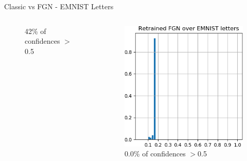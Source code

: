 \documentclass{beamer}
\begin{document}
\begin{frame}{Classic vs FGN - EMNIST Letters \cite{cohen2017emnist}}
\begin{columns}
\begin{column}{.33\textwidth}
\begin{figure}
        \centering \tiny{42\% of confidences $>$0.5}
    \end{figure}
    \end{column}
    \begin{column}{.33\textwidth}
    \begin{figure}
        \includegraphics[width=.85\textwidth]{images/Letters/hist-retrained-letters.png}\\
        \centering \tiny{0.0\% of confidences $>$0.5}
    \end{figure}
    \end{column}
    \end{columns}
    

\end{frame}
\end{document}
